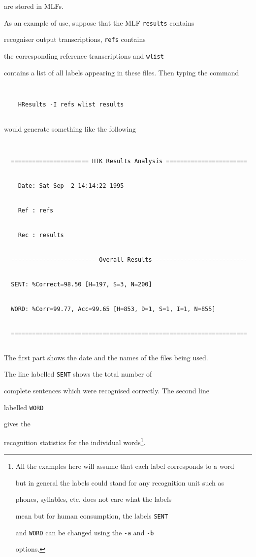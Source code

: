 are stored in MLFs.





As an example of use, suppose that the MLF \texttt{results} contains


recogniser output transcriptions, \texttt{refs} contains


the corresponding reference transcriptions and \texttt{wlist}


contains a list of all labels appearing in these files.  Then typing the command


\begin{verbatim}


    HResults -I refs wlist results


\end{verbatim}


would generate something like the following


\begin{verbatim}


  ====================== HTK Results Analysis =======================


    Date: Sat Sep  2 14:14:22 1995


    Ref : refs


    Rec : results


  ------------------------ Overall Results --------------------------


  SENT: %Correct=98.50 [H=197, S=3, N=200]


  WORD: %Corr=99.77, Acc=99.65 [H=853, D=1, S=1, I=1, N=855]


  ===================================================================


\end{verbatim}


The first part shows the date and the names of the files being used.


The line labelled \texttt{SENT} shows the total number of 


complete sentences which were recognised correctly.  The second line 


labelled \texttt{WORD} 


gives the


recognition statistics for the individual words\footnote{


All the examples here will assume that each label corresponds to a word


but in general the labels could stand for any recognition unit such as


phones, syllables, etc.   does not care what the labels


mean but for human consumption, the labels  \texttt{SENT} 


and \texttt{WORD}  can be changed using the \texttt{-a} and  \texttt{-b} 


options.}.





